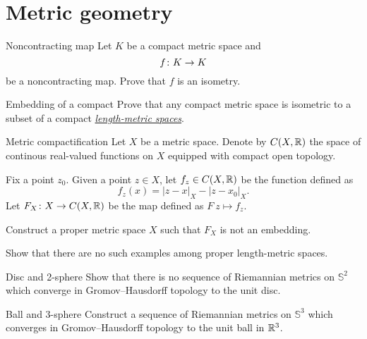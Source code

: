 \documentclass[twoside]{book}
\begin{document}
\chapter{Metric geometry}


\begin{pr}{\easy}{Noncontracting map}\label{Noncontracting map}
Let $K$  be a compact metric space and
\[f\:K\z\to K\] 
be a noncontracting map.
Prove that $f$ is an isometry.
\end{pr}




\begin{pr}{\thm}{Embedding of a compact}\label{compact} 
Prove that any compact metric space 
is isometric to 
a subset of a compact \hyperref[Length-metric space]{\emph{length-metric spaces}}.
\end{pr}

\begin{pr}{\easy}{Metric compactification}\label{Metric compactification}
Let $X$ be a metric space.
Denote by $C(X,\mathbb{R})$ the space of continous real-valued functions on $X$ equipped with compact open topology.

Fix a point $z_0$.
Given a point $z\in X$, let $f_z\in C(X,\mathbb{R})$ be the function defined as 
\[f_z(x)=|z-x|_X-|z-x_0|_X.\]
Let $F_X\colon X\to C(X,\mathbb{R})$ be the map 
defined as $F\:z\mapsto f_z$.

Construct a proper metric space $X$
such that $F_X$ is not an embedding.

Show that there are no such examples among proper length-metric spaces.
\end{pr}




\begin{pr}{}{Disc and 2-sphere}\label{2-sphere is far from a ball}
Show that there is no sequence of Riemannian metrics on
$\mathbb{S}^2$ which converge in Gromov--Hausdorff topology to the unit disc.
\end{pr}


\begin{pr}{}{Ball and 3-sphere}\label{3-sphere is close to a ball}
Construct a sequence of Riemannian metrics on $\mathbb{S}^3$ 
which converges in Gromov--Hausdorff topology 
to the unit ball in $\mathbb{R}^3$.
\end{pr}
\end{document}
